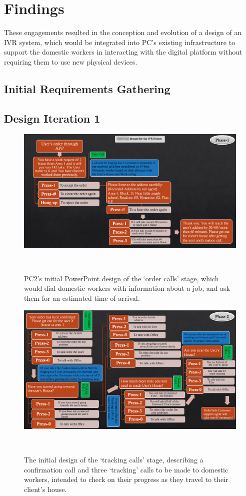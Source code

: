 \section{Findings}

These engagements resulted in the conception and evolution of a design of an IVR system, which would be integrated into PC's existing infrastructure to support the domestic workers in interacting with the digital platform without requiring them to use new physical devices. 

\subsection{Initial Requirements Gathering}

\subsection{Design Iteration 1}

\begin{figure}
  \centering
  \includegraphics[width=\columnwidth]{images/ivr_01_ordercall.png}
  \caption{PC2's initial PowerPoint design of the `order calls' stage, which would dial domestic workers with information about a job, and ask them for an estimated time of arrival.}~\label{fig:OrderCalls}
\end{figure}

\begin{figure}
  \centering
  \includegraphics[width=\columnwidth]{images/ivr_01_tracking.png}
  \caption{The initial design of the `tracking calls' stage, describing a confirmation call and three `tracking' calls to be made to domestic workers, intended to check on their progress as they travel to their client's house.}~\label{fig:TrackingCalls}
\end{figure}

